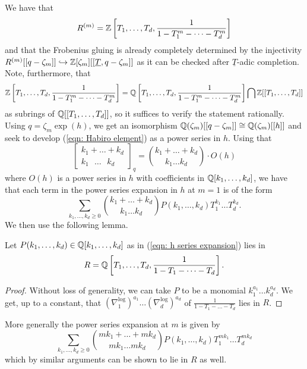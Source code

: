 We have that 
$$R^{(m)}=\mathbb{Z}\left[T_{1},\dots,T_{d},\frac{1}{1-T_{1}^{m}-\dots -T_{d}^{m}}\right]$$
and that the Frobenius gluing is already completely determined by the injectivity $R^{(m)}[[q-\zeta_{m}]]\hookrightarrow\mathbb{Z}[\zeta_{m}][[\underline{T},q-\zeta_{m}]]$ as it can be checked after $\underline{T}$-adic completion. Note, furthermore, that 
{\footnotesize
$$\mathbb{Z}\left[T_{1},\dots,T_{d},\frac{1}{1-T_{1}^{m}-\dots-T_{d}^{m}}\right]=\mathbb{Q}\left[T_{1},\dots,T_{d},\frac{1}{1-T_{1}^{m}-\dots-T_{d}^{m}}\right]\bigcap\mathbb{Z}[[T_{1},\dots,T_{d}]]$$
\normalsize}as subrings of $\mathbb{Q}[[T_{1},\dots,T_{d}]]$, so it suffices to verify the statement rationally. Using $q=\zeta_{m}\exp(h)$, we get an isomorphism $\mathbb{Q}(\zeta_{m})[[q-\zeta_{m}]]\cong\mathbb{Q}(\zeta_{m})[[h]]$ and seek to develop (\ref{eqn: Habiro element}) as a power series in $h$. Using that 
$$\left[\substack{k_{1}+\dots+k_{d} \\ k_{1}\text{ }\dots\text{ }k_{d}}\right]_{q}=\binom{k_{1}+\dots+k_{d}}{k_{1}\dots k_{d}}\cdot O(h)$$
where $O(h)$ is a power series in $h$ with coefficients in $\mathbb{Q}[k_{1},\dots,k_{d}]$, we have that each term in the power series expansion in $h$ at $m=1$ is of the form 
\begin{equation}\label{eqn: h series expansion}
    \sum_{k_{1},\dots,k_{d}\geq0}\binom{k_{1}+\dots+k_{d}}{k_{1}\dots k_{d}}P(k_{1},\dots,k_{d})T_{1}^{k_{1}}\dots T_{d}^{k_{d}}.
\end{equation}
We then use the following lemma. 
\begin{lemma}
    Let $P(k_{1},\dots, k_{d})\in\mathbb{Q}[k_{1},\dots,k_{d}]$ as in (\ref{eqn: h series expansion}) lies in $$R=\mathbb{Q}\left[T_{1},\dots,T_{d},\frac{1}{1-T_{1}-\dots-T_{d}}\right].$$ 
\end{lemma}
\begin{proof}
    Without loss of generality, we can take $P$ to be a monomial $k_{1}^{a_{1}}\dots k_{d}^{a_{d}}$. We get, up to a constant, that $(\nabla_{1}^{\log})^{a_{1}}\dots(\nabla_{d}^{\log})^{a_{d}}$ of $\frac{1}{1-T_{1}-\dots-T_{d}}$ lies in $R$. 
\end{proof}
More generally the power series expansion at $m$ is given by 
\begin{equation}\label{eqn: h series expansion at m}
    \sum_{k_{1},\dots,k_{d}\geq0}\binom{mk_{1}+\dots+mk_{d}}{mk_{1}\dots mk_{d}}P(k_{1},\dots,k_{d})T_{1}^{mk_{1}}\dots T_{d}^{mk_{d}}
\end{equation}
which by similar arguments can be shown to lie in $R$ as well. 